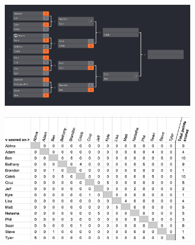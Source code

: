 \documentclass[letterpaper, 10 pt, conference]{ieeeconf}  %
\begin{document}
\begin{figure}[h!b]
        \centering
        \begin{subfigure}[ht]{0.5\textwidth}
                \centering
                \includegraphics[width=0.9\textwidth]{fig/singles-bracket_4.png}
        \end{subfigure}
        \begin{subfigure}[ht]{0.4\textwidth}
                \centering
                \includegraphics[width=0.9\textwidth]{fig/score-matrix_4.png}
        \end{subfigure}
        

\end{figure}
\end{document}
